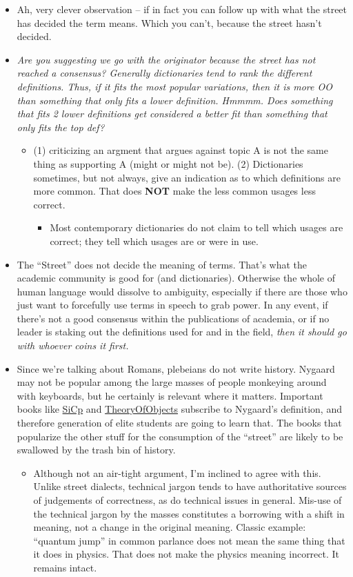 \documentclass[10pt,twoside,openright]{memoir}
\begin{document}
\begin{itemize}
\item Ah, very clever observation -- if in fact you can follow up with what the street has decided the term means. Which you can't, because the street hasn't decided.
\item \emph{Are you suggesting we go with the originator because the street has not reached a consensus? Generally dictionaries tend to rank the different definitions. Thus, if it fits the most popular variations, then it is more OO than something that only fits a lower definition. Hmmmm. Does something that fits 2 lower definitions get considered a better fit than something that only fits the top def?}
\begin{itemize}
\item (1) criticizing an argment that argues against topic A is not the same thing as supporting A (might or might not be). (2) Dictionaries sometimes, but not always, give an indication as to which definitions are more common. That does \textbf{NOT} make the less common usages less correct.
\begin{itemize}
\item Most contemporary dictionaries do not claim to tell which usages are correct; they tell which usages are or were in use.
\end{itemize}
\end{itemize}
\item The ``Street'' does not decide the meaning of terms. That's what the academic community is good for (and dictionaries). Otherwise the whole of human language would dissolve to ambiguity, especially if there are those who just want to forcefully use terms in speech to grab power. In any event, if there's not a good consensus within the publications of academia, or if no leader is staking out the definitions used for and in the field, \emph{then it should go with whoever coins it first.}
\item Since we're talking about Romans, plebeians do not write history. Nygaard may not be popular among the large masses of people monkeying around with keyboards, but he certainly is relevant where it matters. Important books like \ul{SiCp} and \ul{TheoryOfObjects} subscribe to Nygaard's definition, and therefore generation of elite students are going to learn that. The books that popularize the other stuff for the consumption of the ``street'' are likely to be swallowed by the trash bin of history.
\begin{itemize}
\item Although not an air-tight argument, I'm inclined to agree with this. Unlike street dialects, technical jargon tends to have authoritative sources of judgements of correctness, as do technical issues in general. Mis-use of the technical jargon by the masses constitutes a borrowing with a shift in meaning, not a change in the original meaning. Classic example: ``quantum jump'' in common parlance does not mean the same thing that it does in physics. That does not make the physics meaning incorrect. It remains intact.

\end{itemize}
\end{itemize}
\end{document}
